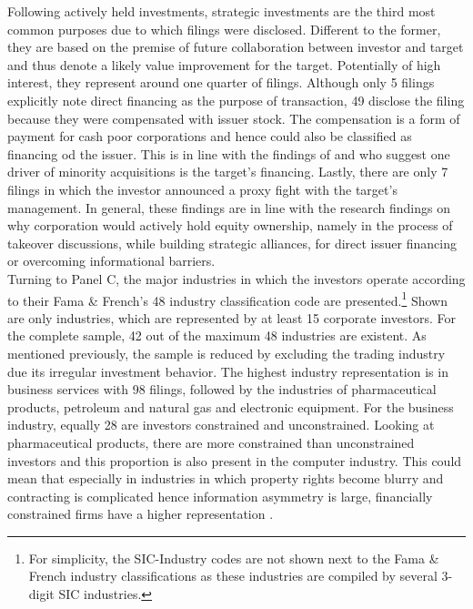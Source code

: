 \documentclass[12pt]{article}
\begin{document}
Following actively held investments, strategic investments are the third most common purposes due to which filings were disclosed. Different to the former, they are based on the premise of future collaboration between investor and target and thus denote a likely value improvement for the target. Potentially of high interest, they represent around one quarter of filings. Although only 5 filings explicitly note direct financing as the purpose of transaction, 49 disclose the filing because they were compensated with issuer stock. The compensation is a form of payment for cash poor corporations and hence could also be classified as financing od the issuer. This is in line with the findings of \citet[p.2792]{Allen2000} and \citet[p.78]{Liao2014} who suggest one driver of minority acquisitions is the target's financing. Lastly, there are only 7 filings in which the investor announced a proxy fight with the target's management. In general, these findings are in line with the research findings on why corporation would actively hold equity ownership, namely in the process of takeover discussions, while building strategic alliances, for direct issuer financing or overcoming informational barriers.\\
Turning to Panel C, the major industries in which the investors operate according to their Fama \& French's 48 industry classification code are presented.\footnote{For simplicity, the SIC-Industry codes are not shown next to the Fama \& French industry classifications as these industries are compiled by several 3-digit SIC industries.} Shown are only industries, which are represented by at least 15 corporate investors. For the complete sample, 42 out of the maximum 48 industries are existent. As mentioned previously, the sample is reduced by excluding the trading industry due its irregular investment behavior. The highest industry representation is in business services with 98 filings, followed by the industries of pharmaceutical products, petroleum and natural gas and electronic equipment. For the business industry, equally 28 are investors constrained and unconstrained. Looking at pharmaceutical products, there are more constrained than unconstrained investors and this proportion is also present in the computer industry. This could mean that especially in industries in which property rights become blurry and contracting is complicated hence information asymmetry is large, financially constrained firms have a higher representation \citep[p.4]{Liao2014}.
\end{document}

